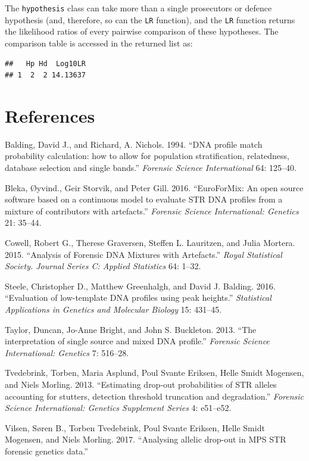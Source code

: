 \documentclass[]{article}
\newenvironment{Shaded}{\begin{snugshade}}{\end{snugshade}}
\newcommand{\OperatorTok}[1]{\textcolor[rgb]{0.81,0.36,0.00}{\textbf{#1}}}
\newcommand{\NormalTok}[1]{#1}
\begin{document}
The \texttt{hypothesis} class can take more than a single prosecutors or
defence hypothesis (and, therefore, so can the \texttt{LR} function),
and the \texttt{LR} function returns the likelihood ratios of every
pairwise comparison of these hypotheses. The comparison table is
accessed in the returned list as:

\begin{Shaded}
\end{Shaded}

\begin{verbatim}
##   Hp Hd  Log10LR
## 1  2  2 14.13637
\end{verbatim}

\section*{References}\label{references}

\hypertarget{refs}{}
\hypertarget{ref-Balding1994}{}
Balding, David J., and Richard, A. Nichols. 1994. ``DNA profile match
probability calculation: how to allow for population stratification,
relatedness, database selection and single bands.'' \emph{Forensic
Science International} 64: 125--40.

\hypertarget{ref-oyvind_bleka_2016}{}
Bleka, Øyvind., Geir Storvik, and Peter Gill. 2016. ``EuroForMix: An
open source software based on a continuous model to evaluate STR DNA
profiles from a mixture of contributors with artefacts.'' \emph{Forensic
Science International: Genetics} 21: 35--44.

\hypertarget{ref-cowell_etal_2015}{}
Cowell, Robert G., Therese Graversen, Steffen L. Lauritzen, and Julia
Mortera. 2015. ``Analysis of Forensic DNA Mixtures with Artefacts.''
\emph{Royal Statistical Society. Journal Series C: Applied Statistics}
64: 1--32.

\hypertarget{ref-steele_2016}{}
Steele, Christopher D., Matthew Greenhalgh, and David J. Balding. 2016.
``Evaluation of low-template DNA profiles using peak heights.''
\emph{Statistical Applications in Genetics and Molecular Biology} 15:
431--45.

\hypertarget{ref-taylor_etal_2013}{}
Taylor, Duncan, Jo-Anne Bright, and John S. Buckleton. 2013. ``The
interpretation of single source and mixed DNA profile.'' \emph{Forensic
Science International: Genetics} 7: 516--28.

\hypertarget{ref-tvedebrink_etal_2013}{}
Tvedebrink, Torben, Maria Asplund, Poul Svante Eriksen, Helle Smidt
Mogensen, and Niels Morling. 2013. ``Estimating drop-out probabilities
of STR alleles accounting for stutters, detection threshold truncation
and degradation.'' \emph{Forensic Science International: Genetics
Supplement Series} 4: e51--e52.

\hypertarget{ref-Vilsen2017b}{}
Vilsen, Søren B., Torben Tvedebrink, Poul Svante Eriksen, Helle Smidt
Mogensen, and Niels Morling. 2017. ``Analysing allelic drop-out in MPS
STR forensic genetics data.''
\end{document}
